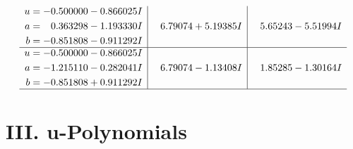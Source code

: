 \documentclass[1p]{elsarticle_modified}
\theoremstyle{definition}
\begin{document}
$$\begin{array}{c|c|c}
\begin{aligned}
u &= -0.500000 - 0.866025 I \\
a &= \phantom{-}0.363298 - 1.193330 I \\
b &= -0.851808 - 0.911292 I\end{aligned}
 & \phantom{-}6.79074 + 5.19385 I & \phantom{-}5.65243 - 5.51994 I \\ \hline\begin{aligned}
u &= -0.500000 - 0.866025 I \\
a &= -1.215110 - 0.282041 I \\
b &= -0.851808 + 0.911292 I\end{aligned}
 & \phantom{-}6.79074 - 1.13408 I & \phantom{-}1.85285 - 1.30164 I\\
 \hline 
 \end{array}$$\newpage
\newpage\renewcommand{\arraystretch}{1}
\centering \section*{ III. u-Polynomials}
\end{document}
